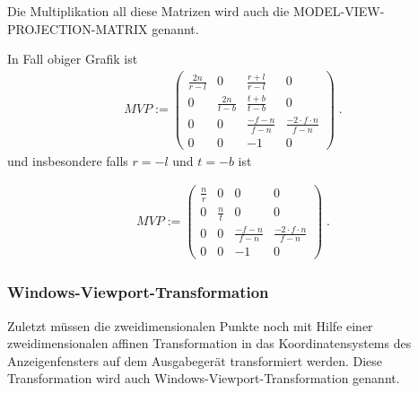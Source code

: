 Die Multiplikation all diese Matrizen wird auch die MODEL-VIEW-PROJECTION-MATRIX genannt. 

In Fall obiger Grafik ist 
\begin{align*}
MVP := \begin{pmatrix}  
\frac{2n}{r-l}  &  0 &  \frac{r+l}{r-l}  & 0  \\
0   &  \frac{2n}{t-b} & \frac{t+b}{t-b} & 0  \\
0   &  0 & \frac{-f-n}{f-n} & \frac{-2\cdot f \cdot n}{f-n}  \\
0   &  0 & -1 & 0  
\end{pmatrix}  \; .
\end{align*} 
und insbesondere falls $r = -l$ und $t=-b$  ist

\begin{align*}
MVP := \begin{pmatrix}  
\frac{n}{r}  &  0 & 0  & 0  \\
0   &  \frac{n}{t} & 0 & 0  \\
0   &  0 & \frac{-f-n}{f-n} & \frac{-2\cdot f \cdot n}{f-n}  \\
0   &  0 & -1 & 0  
\end{pmatrix}  \; .
\end{align*} 

\subsubsection*{Windows-Viewport-Transformation}
Zuletzt müssen die zweidimensionalen Punkte noch mit Hilfe einer 
zweidimensionalen affinen Transformation in das Koordinatensystems des 
Anzeigenfensters auf dem Ausgabegerät transformiert werden. 
Diese Transformation wird auch Windows-Viewport-Transformation genannt.

